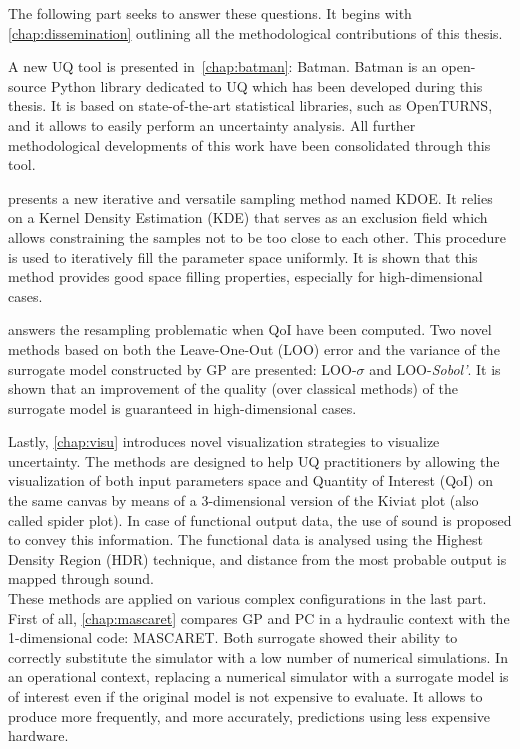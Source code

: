 The following part seeks to answer these questions. It begins with \cref{chap:dissemination} outlining all the methodological contributions of this thesis.

A new UQ tool is presented in~\cref{chap:batman}: Batman. Batman is an open-source Python library dedicated to UQ which has been developed during this thesis. It is based on state-of-the-art statistical libraries, such as OpenTURNS, and it allows to easily perform an uncertainty analysis. All further methodological developments of this work have been consolidated through this tool.

 presents a new iterative and versatile sampling method named KDOE. It relies on a Kernel Density Estimation (KDE) that serves as an exclusion field which allows constraining the samples not to be too close to each other. This procedure is used to iteratively fill the parameter space uniformly. It is shown that this method provides good space filling properties, especially for high-dimensional cases.

 answers the resampling problematic when QoI have been computed. Two novel methods based on both the Leave-One-Out (LOO) error and the variance of the surrogate model constructed by GP are presented: LOO-$\sigma$ and LOO-\emph{Sobol'}. It is shown that an improvement of the quality (over classical methods) of the surrogate model is guaranteed in high-dimensional cases.

Lastly, \cref{chap:visu} introduces novel visualization strategies to visualize uncertainty. The methods are designed to help UQ practitioners by allowing the visualization of both input parameters space and  Quantity of Interest (QoI) on the same canvas by means of a 3-dimensional version of the Kiviat plot (also called spider plot). In case of functional output data, the use of sound is proposed to convey this information. The functional data is analysed using the Highest Density Region (HDR) technique, and distance from the most probable output is mapped through sound.\\
 
These methods are applied on various complex configurations in the last part. First of all, \cref{chap:mascaret} compares GP and PC in a hydraulic context with the 1-dimensional code: MASCARET. Both surrogate showed their ability to correctly substitute the simulator with a low number of numerical simulations. In an operational context, replacing a numerical simulator with  a surrogate model is of interest even if the original model is not expensive to evaluate. It allows to produce more frequently, and more accurately, predictions using less expensive hardware.

